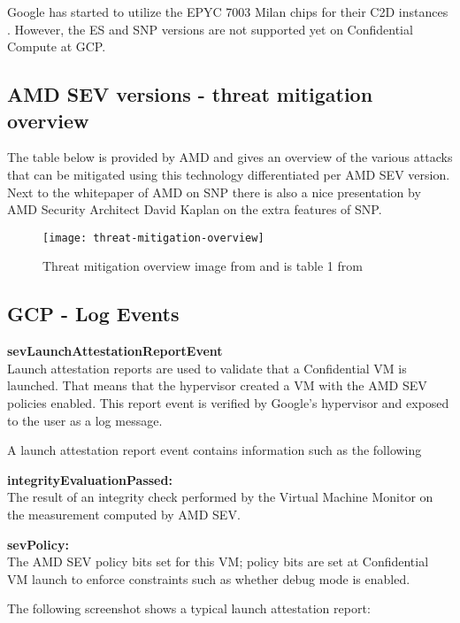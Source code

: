 Google has started to utilize the EPYC 7003 Milan chips 
for their C2D instances \citep{czop_introducing_2022}. 
However, the ES and SNP versions 
are not supported yet on Confidential Compute at GCP. 

\newpage
\subsection{AMD SEV versions - threat mitigation overview}
The table below is provided by AMD 
and gives an overview of the various attacks 
that can be mitigated using this technology differentiated per AMD SEV version. 
Next to the whitepaper of AMD on SNP \citep{amd_amd_2020}
there is also a nice presentation by AMD Security Architect 
David Kaplan \citep{kaplan_upcoming_2019} on the extra features of SNP. 

\begin{figure}[!ht]
    \centering
    \texttt{[image: threat-mitigation-overview]}
    \caption{Threat mitigation overview image 
     from \cite{larabel_amd_2022} and is table 1 from \cite{amd_amd_2020}}
    \label{fig:threat-mitigation-overview}
\end{figure}

 

\subsection{GCP - Log Events}

\textbf{sevLaunchAttestationReportEvent}\\
Launch attestation reports are used to validate 
that a Confidential VM is launched. 
That means that the hypervisor created a VM 
with the AMD SEV policies enabled. 
This report event is verified by Google’s hypervisor 
and exposed to the user as a log message.

A launch attestation report event contains information such as the following

\textbf{integrityEvaluationPassed: }\\
The result of an integrity check performed by the Virtual Machine Monitor 
on the measurement computed by AMD SEV.

\textbf{sevPolicy: }\\
The AMD SEV policy bits set for this VM; 
policy bits are set at Confidential VM launch to enforce constraints such as whether debug mode is enabled.

The following screenshot shows a typical launch attestation report:


